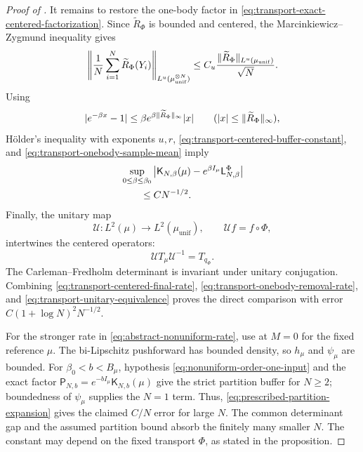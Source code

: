 \documentclass[11pt,reqno]{amsart}
\numberwithin{equation}{section}
\theoremstyle{plain}
\theoremstyle{definition}
\DeclarePairedDelimiter{\abs}{\lvert}{\rvert}
\DeclarePairedDelimiter{\norm}{\lVert}{\rVert}
\newcommand{\be}{\beta}
\newcommand{\K}{\mathsf K}
\newcommand{\tl}{\widetilde}
\newcommand{\muunif}{\mu_{\mathrm{unif}}}
\begin{document}
\begin{proof}[Proof of ]
It remains to restore the one-body factor in \eqref{eq:transport-exact-centered-factorization}.  Since $\tl R_\Phi$ is bounded and centered, the Marcinkiewicz--Zygmund inequality gives
\begin{equation}
 \norm*{\frac1N\sum_{i=1}^N\tl R_\Phi(Y_i)}_{L^u(\muunif^{\otimes N})}
 \leq C_u\frac{\norm{\tl R_\Phi}_{L^u(\muunif)}}{\sqrt N}.
 \label{eq:transport-onebody-sample-mean}
\end{equation}
Using
\begin{equation}
 \abs{e^{-\be x}-1}
 \leq\be e^{\be\norm{\tl R_\Phi}_\infty}\abs x
 \qquad(\abs x\leq\norm{\tl R_\Phi}_\infty),
 \label{eq:transport-onebody-exponential-difference}
\end{equation}
H\"older's inequality with exponents $u,r$, \eqref{eq:transport-centered-buffer-constant}, and \eqref{eq:transport-onebody-sample-mean} imply
\begin{align}
 &\sup_{0\leq\be\leq\be_0}
 \left|\K_{N,\be}(\mu)
 -e^{\be I_{\mu}}\mathsf L_{N,\be}^{\Phi}\right|
 \notag\\
 &\qquad\leq C N^{-1/2}.
 \label{eq:transport-onebody-removal-rate}
\end{align}
Finally, the unitary map
\begin{equation}
 \mathcal U:L^2(\mu)\longrightarrow L^2(\muunif),
 \qquad
 \mathcal U f=f\circ\Phi,
 \label{eq:transport-unitary-map}
\end{equation}
intertwines the centered operators:
\begin{equation}
 \mathcal U T_{\mu}\mathcal U^{-1}=T_{q_\Phi}.
 \label{eq:transport-unitary-equivalence}
\end{equation}
The Carleman--Fredholm determinant is invariant under unitary conjugation. Combining \eqref{eq:transport-centered-final-rate}, \eqref{eq:transport-onebody-removal-rate}, and \eqref{eq:transport-unitary-equivalence} proves the direct comparison with error $C(1+\log N)^2N^{-1/2}$.

For the stronger rate in \eqref{eq:abstract-nonuniform-rate}, use  at $M=0$ for the fixed reference $\mu$. The bi-Lipschitz pushforward has bounded density, so $h_\mu$ and $\psi_\mu$ are bounded. For $\be_0<b<B_\mu$, hypothesis \eqref{eq:nonuniform-order-one-input} and the exact factor $\mathsf P_{N,b}=e^{-bI_\mu}\K_{N,b}(\mu)$ give the strict partition buffer for $N\geq2$; boundedness of $\psi_\mu$ supplies the $N=1$ term. Thus, \eqref{eq:prescribed-partition-expansion} gives the claimed $C/N$ error for large $N$. The common determinant gap and the assumed partition bound absorb the finitely many smaller $N$. The constant may depend on the fixed transport $\Phi$, as stated in the proposition.
\end{proof}
\end{document}
